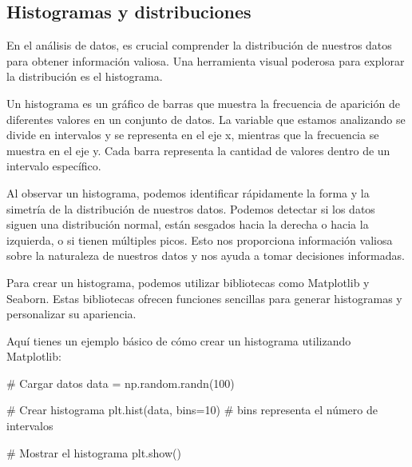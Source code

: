 \documentclass[
  a4paper,
]{article}
\newenvironment{Shaded}{}{}
\newcommand{\CommentTok}[1]{\textcolor[rgb]{0.42,0.45,0.49}{#1}}
\newcommand{\DecValTok}[1]{\textcolor[rgb]{0.00,0.36,0.77}{#1}}
\newcommand{\NormalTok}[1]{\textcolor[rgb]{0.14,0.16,0.18}{#1}}
\newcommand{\OperatorTok}[1]{\textcolor[rgb]{0.14,0.16,0.18}{#1}}
\begin{document}
\hypertarget{histogramas-y-distribuciones}{%
\subsection{Histogramas y
distribuciones}\label{histogramas-y-distribuciones}}

En el análisis de datos, es crucial comprender la distribución de
nuestros datos para obtener información valiosa. Una herramienta visual
poderosa para explorar la distribución es el histograma.

Un histograma es un gráfico de barras que muestra la frecuencia de
aparición de diferentes valores en un conjunto de datos. La variable que
estamos analizando se divide en intervalos y se representa en el eje x,
mientras que la frecuencia se muestra en el eje y. Cada barra representa
la cantidad de valores dentro de un intervalo específico.

Al observar un histograma, podemos identificar rápidamente la forma y la
simetría de la distribución de nuestros datos. Podemos detectar si los
datos siguen una distribución normal, están sesgados hacia la derecha o
hacia la izquierda, o si tienen múltiples picos. Esto nos proporciona
información valiosa sobre la naturaleza de nuestros datos y nos ayuda a
tomar decisiones informadas.

Para crear un histograma, podemos utilizar bibliotecas como Matplotlib y
Seaborn. Estas bibliotecas ofrecen funciones sencillas para generar
histogramas y personalizar su apariencia.

Aquí tienes un ejemplo básico de cómo crear un histograma utilizando
Matplotlib:

\begin{Shaded}
\begin{Highlighting}[]
\CommentTok{\# Cargar datos}
\NormalTok{data }\OperatorTok{=}\NormalTok{ np.random.randn(}\DecValTok{100}\NormalTok{)}

\CommentTok{\# Crear histograma}
\NormalTok{plt.hist(data, bins}\OperatorTok{=}\DecValTok{10}\NormalTok{)  }\CommentTok{\# bins representa el número de intervalos}

\CommentTok{\# Mostrar el histograma}
\NormalTok{plt.show()}
\end{Highlighting}
\end{Shaded}
\end{document}
